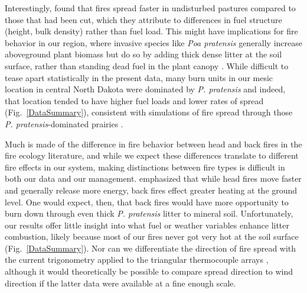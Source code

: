 \documentclass[referee, 
		     sn-basic]{sn-jnl}
\begin{document}
\begin{linenumbers}
Interestingly, \citet{cheney1993} found that fires spread faster in
undisturbed pastures compared to those that had been cut, which they
attribute to differences in fuel structure (height, bulk density) rather
than fuel load. This might have implications for fire behavior in our
region, where invasive species like \emph{Poa pratensis} generally
increase aboveground plant biomass but do so by adding thick dense
litter at the soil surface, rather than standing dead fuel in the plant
canopy \citep{gasch2020}. While difficult to tease apart statistically
in the present data, many burn units in our mesic location in central
North Dakota were dominated by \emph{P. pratensis} and indeed, that
location tended to have higher fuel loads and lower rates of spread
(Fig.~\ref{DataSummary}), consistent with simulations of fire spread through those
\emph{P. pratensis}-dominated prairies \citep{yurkonis2019}.

Much is made of the difference in fire behavior between head and back
fires in the fire ecology literature, and while we expect these
differences translate to different fire effects in our system, making
distinctions between fire types is difficult in both our data and our
management. \citet{trollope1978} emphasized that while head fires move
faster and generally release more energy, back fires effect greater
heating at the ground level. One would expect, then, that back fires
would have more opportunity to burn down through even thick \emph{P.
pratensis} litter to mineral soil. Unfortunately, our results offer
little insight into what fuel or weather variables enhance litter
combustion, likely because most of our fires never got very hot at the
soil surface  (Fig.~\ref{DataSummary}). 
Nor can we differentiate the direction of fire spread with the current trigonometry applied to the triangular thermocouple arrays \citep{simard1984}, although it would theoretically be possible to compare spread direction to wind direction if the latter data were available at a fine enough scale.


\end{linenumbers}
\end{document}

